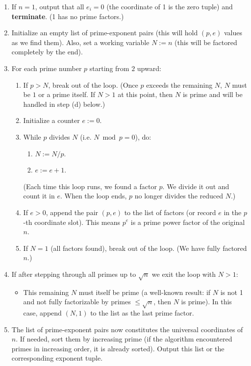 \documentclass[11pt]{article}
\begin{document}
\begin{enumerate}[itemsep=0pt, topsep=4pt]
  \item If $n = 1$, output that all $e_i = 0$ (the coordinate of 1 is the zero tuple) and \textbf{terminate}. (1 has no prime factors.)
  \item Initialize an empty list of prime-exponent pairs (this will hold $(p, e)$ values as we find them). Also, set a working variable $N := n$ (this will be factored completely by the end).
  \item For each prime number $p$ starting from $2$ upward:
  \begin{enumerate}
    \item If $p > N$, break out of the loop. (Once $p$ exceeds the remaining $N$, $N$ must be $1$ or a prime itself. If $N>1$ at this point, then $N$ is prime and will be handled in step (d) below.)
    \item Initialize a counter $e := 0$.
    \item While $p$ divides $N$ (i.e. $N \bmod p = 0$), do:
    \begin{enumerate}
        \item $N := N / p$.
        \item $e := e + 1$.
    \end{enumerate}
    (Each time this loop runs, we found a factor $p$. We divide it out and count it in $e$. When the loop ends, $p$ no longer divides the reduced $N$.)
    \item If $e > 0$, append the pair $(p, e)$ to the list of factors (or record $e$ in the $p$-th coordinate slot). This means $p^e$ is a prime power factor of the original $n$.
    \item If $N = 1$ (all factors found), break out of the loop. (We have fully factored $n$.)
  \end{enumerate}
  \item If after stepping through all primes up to $\sqrt{n}$ we exit the loop with $N > 1$: 
  \begin{itemize}
      \item This remaining $N$ must itself be prime (a well-known result: if $N$ is not 1 and not fully factorizable by primes $\le \sqrt{n}$, then $N$ is prime). In this case, append $(N, 1)$ to the list as the last prime factor.
  \end{itemize}
  \item The list of prime-exponent pairs now constitutes the universal coordinates of $n$. If needed, sort them by increasing prime (if the algorithm encountered primes in increasing order, it is already sorted). Output this list or the corresponding exponent tuple.
\end{enumerate}
\end{document}

